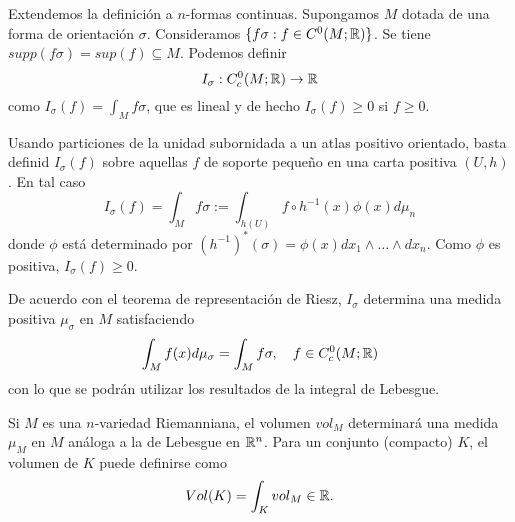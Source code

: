 \documentclass[CV.tex]{subfiles}
\begin{document}
\begin{nota}
Extendemos la definición a $n$-formas continuas. Supongamos $M$ dotada de una forma de orientación $\sigma$. Consideramos $\{f\sigma:f\in C^0(M;\mathbb{R})\}$. Se tiene $supp(f\sigma)=sup(f)\subseteq M$. Podemos definir 
\[
I_\sigma:C_c^0(M;\mathbb{R})\to\mathbb{R}
\]
como $I_\sigma(f)=\int_M f\sigma$, que es lineal y de hecho $I_\sigma(f)\geq 0$ si $f\geq 0$. 

Usando particiones de la unidad subornidada a un atlas positivo orientado, basta definid $I_\sigma(f)$ sobre aquellas $f$ de soporte pequeño en una carta positiva $(U,h)$. En tal caso
\[
I_\sigma(f)=\int_M f\sigma:=\int_{h(U)}f\circ h^{-1}(x)\phi(x) d\mu_n
\]
donde $\phi$ está determinado por $(h^{-1})^*(\sigma)=\phi(x)dx_1\land\dots\land dx_n$. Como $\phi$ es positiva, $I_\sigma(f)\geq 0$.

De acuerdo con el teorema de representación de Riesz, $I_\sigma$ determina una medida positiva $\mu_\sigma$ en $M$ satisfaciendo
\[
\int_M f(x)d\mu_\sigma=\int_M f\sigma, \quad f\in C_c^0(M;\mathbb{R})
\]
con lo que se podrán utilizar los resultados de la integral de Lebesgue. 

Si $M$ es una $n$-variedad Riemanniana, el volumen $vol_M$ determinará una medida $\mu_M$ en $M$ análoga a la de Lebesgue en $\mathbb{R}^n$. Para un conjunto (compacto) $K$, el volumen de $K$ puede definirse como 
\[
Vol(K)=\int_K vol_M\in\mathbb{R}.
\]
\end{nota}
\end{document}
